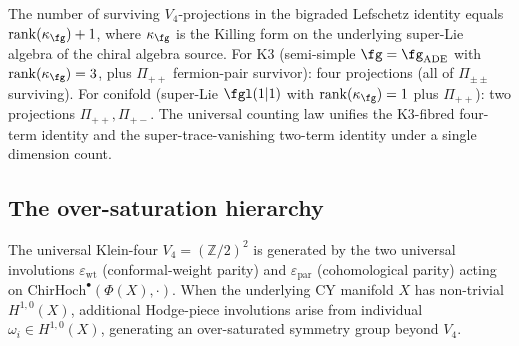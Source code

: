 \begin{remark}
\label{rem:killing-rank-counting}
The number of surviving $V_4$-projections in the bigraded Lefschetz
identity equals
$\mathrm{rank}(\kappa_{\fg}) + 1$, where $\kappa_{\fg}$ is the
Killing form on the underlying super-Lie algebra of the chiral
algebra source. For K$3$ \textup{(}semi-simple
$\fg = \fg_{\mathrm{ADE}}$ with $\mathrm{rank}(\kappa_{\fg}) = 3$, plus
$\Pi_{++}$ fermion-pair survivor\textup{):} four projections
\textup{(}all of $\Pi_{\pm\pm}$ surviving\textup{).} For conifold
\textup{(}super-Lie $\fgl(1\vert 1)$ with $\mathrm{rank}(\kappa_{\fg}) = 1$
plus $\Pi_{++}$\textup{):} two projections
$\Pi_{++}, \Pi_{+-}$. The universal counting law unifies the
K$3$-fibred four-term identity and the super-trace-vanishing
two-term identity under a single dimension count.
\end{remark}

\subsection{The over-saturation hierarchy}
\label{subsec:oversaturation-hierarchy}

The universal Klein-four $V_4 = (\mathbb{Z}/2)^2$ is generated by the
two universal involutions $\varepsilon_{\mathrm{wt}}$
(conformal-weight parity) and $\varepsilon_{\mathrm{par}}$
(cohomological parity) acting on
$\mathrm{ChirHoch}^\bullet(\Phi(X), \cdot)$. When the underlying CY
manifold $X$ has non-trivial $H^{1,0}(X)$, additional Hodge-piece
involutions arise from individual $\omega_i \in H^{1,0}(X)$, generating
an over-saturated symmetry group beyond $V_4$.

